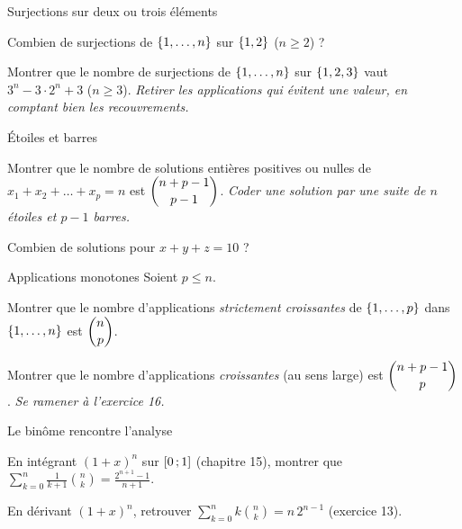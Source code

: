 \begin{exercice}[2]{Surjections sur deux ou trois éléments}
\begin{questions}
  \item Combien de surjections de $\left\{1,\dots,n\right\}$ sur $\left\{1,2\right\}$
    ($n\geqslant2$) ?
  \item Montrer que le nombre de surjections de $\left\{1,\dots,n\right\}$ sur
    $\left\{1,2,3\right\}$ vaut $3^{n}-3\cdot2^{n}+3$ ($n\geqslant3$).
    \emph{Retirer les applications qui évitent une valeur, en comptant
    bien les recouvrements.}
\end{questions}
\end{exercice}

\begin{exercice}[2]{Étoiles et barres}
\begin{questions}
  \item Montrer que le nombre de solutions entières positives ou nulles
    de $x_1+x_2+\dots+x_p=n$ est $\dbinom{n+p-1}{p-1}$. \emph{Coder une
    solution par une suite de $n$ étoiles et $p-1$ barres.}
  \item Combien de solutions pour $x+y+z=10$ ?
\end{questions}
\end{exercice}

\begin{exercice}[2]{Applications monotones}
Soient $p\leqslant n$.
\begin{questions}
  \item Montrer que le nombre d'applications \emph{strictement
    croissantes} de $\left\{1,\dots,p\right\}$ dans $\left\{1,\dots,n\right\}$ est
    $\dbinom np$.
  \item Montrer que le nombre d'applications \emph{croissantes} (au sens
    large) est $\dbinom{n+p-1}{p}$. \emph{Se ramener à l'exercice 16.}
\end{questions}
\end{exercice}

\begin{exercice}[2]{Le binôme rencontre l'analyse}
\begin{questions}
  \item En intégrant $(1+x)^{n}$ sur $\mathopen{[}0\,{;}\,1\mathclose{]}$ (chapitre 15),
    montrer que
    $\displaystyle\sum_{k=0}^{n}\frac{1}{k+1}\binom nk
    =\frac{2^{n+1}-1}{n+1}$.
  \item En dérivant $(1+x)^{n}$, retrouver
    $\displaystyle\sum_{k=0}^{n}k\binom nk=n\,2^{n-1}$ (exercice 13).
\end{questions}
\end{exercice}

